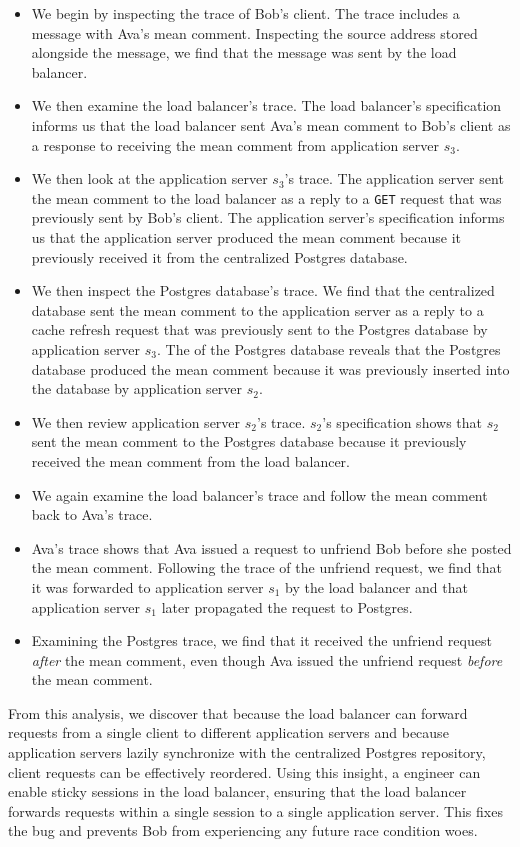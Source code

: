 \begin{itemize}
  \item
    We begin by inspecting the trace of Bob's \systemname{} client. The trace
    includes a message with Ava's mean comment. Inspecting the source address
    stored alongside the message, we find that the message was sent by the load
    balancer.
  \item
    We then examine the load balancer's trace. The load balancer's
    \watprovenance{} specification informs us that the load balancer sent Ava's
    mean comment to Bob's \systemname{} client as a response to receiving the
    mean comment from application server $s_3$.
  \item
    We then look at the application server $s_3$'s trace. The application
    server sent the mean comment to the load balancer as a reply to a
    \texttt{GET} request that was previously sent by Bob's \systemname{}
    client. The application server's \watprovenance{} specification informs us
    that the application server produced the mean comment because it previously
    received it from the centralized Postgres database.
  \item
    We then inspect the Postgres database's trace. We find that the centralized
    database sent the mean comment to the application server as a reply to a
    cache refresh request that was previously sent to the Postgres database by
    application server $s_3$. The \watprovenance{} of the Postgres database
    reveals that the Postgres database produced the mean comment because it was
    previously inserted into the database by application server $s_2$.
  \item
    We then review application server $s_2$'s trace. $s_2$'s \watprovenance{}
    specification shows that $s_2$ sent the mean comment to the Postgres
    database because it previously received the mean comment from the load
    balancer.
  \item
    We again examine the load balancer's trace and follow the mean comment back
    to Ava's \systemname{} trace.
  \item
    Ava's trace shows that Ava issued a request to unfriend Bob before she
    posted the mean comment. Following the trace of the unfriend request, we
    find that it was forwarded to application server $s_1$ by the load
    balancer and that application server $s_1$ later propagated the request to
    Postgres.
  \item
    Examining the Postgres trace, we find that it received the unfriend request
    \emph{after} the mean comment, even though Ava issued the unfriend request
    \emph{before} the mean comment.
\end{itemize}

From this analysis, we discover that because the load balancer can forward
requests from a single client to different application servers and because
application servers lazily synchronize with the centralized Postgres
repository, client requests can be effectively reordered. Using this insight, a
\systemname{} engineer can enable sticky sessions in the load balancer,
ensuring that the load balancer forwards requests within a single session to a
single application server. This fixes the bug and prevents Bob from
experiencing any future race condition woes.

